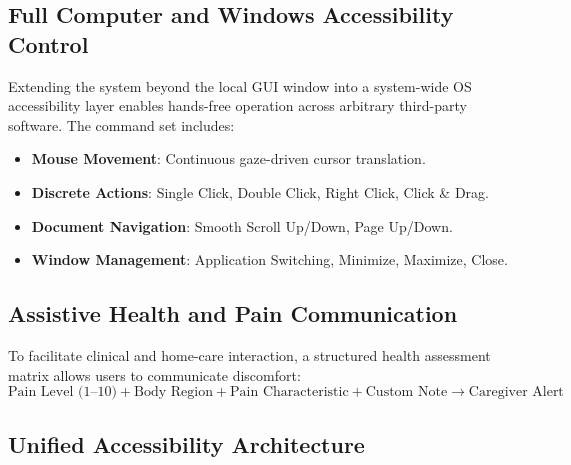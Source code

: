 \documentclass[11pt,a4paper]{article}
\begin{document}
\subsection{Full Computer and Windows Accessibility Control}

Extending the system beyond the local GUI window into a system-wide OS accessibility layer enables hands-free operation across arbitrary third-party software. The command set includes:
\begin{itemize}
    \item \textbf{Mouse Movement}: Continuous gaze-driven cursor translation.
    \item \textbf{Discrete Actions}: Single Click, Double Click, Right Click, Click \& Drag.
    \item \textbf{Document Navigation}: Smooth Scroll Up/Down, Page Up/Down.
    \item \textbf{Window Management}: Application Switching, Minimize, Maximize, Close.
\end{itemize}

\subsection{Assistive Health and Pain Communication}

To facilitate clinical and home-care interaction, a structured health assessment matrix allows users to communicate discomfort:
\begin{equation}
\text{Pain Level (1--10)} + \text{Body Region} + \text{Pain Characteristic} + \text{Custom Note} \rightarrow \text{Caregiver Alert}
\end{equation}

\subsection{Unified Accessibility Architecture}
\end{document}
